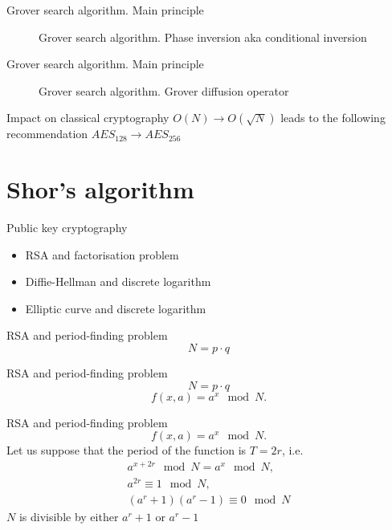 \documentclass[10pt,pdf,hyperref={unicode}]{beamer}
\begin{document}
\begin{frame}{Grover search algorithm. Main principle}
\begin{figure}
\centering

\scalebox{.9}{}

\caption{Grover search algorithm. Phase inversion aka conditional inversion}
\label{figQuantCompGroverInv}
\end{figure}
\end{frame}

\begin{frame}{Grover search algorithm. Main principle}
\begin{figure}
\centering

\scalebox{.8}{}

\caption{Grover search algorithm. Grover diffusion operator}
\label{figQuantCompGroverInvMiddle}
\end{figure}

\end{frame}


\begin{frame}{Impact on classical cryptography}
  $O(N) \rightarrow O(\sqrt{N})$
  leads to the following recommendation 
  $AES_{128} \rightarrow AES_{256}$
\end{frame}


\section{Shor's algorithm}
\begin{frame}{Public key cryptography}
\begin{itemize}
\item RSA and factorisation problem 
\item Diffie-Hellman and discrete logarithm
\item Elliptic curve and discrete logarithm
\end{itemize}
\end{frame}

\begin{frame}{RSA and period-finding problem}
\[
N = p \cdot q
\]
\end{frame}

\begin{frame}{RSA and period-finding problem}
\[
N = p \cdot q
\]
\[
f\left(x, a\right) = a^x \mod N.
\]
\end{frame}

\begin{frame}{RSA and period-finding problem}
\[
f\left(x, a\right) = a^x \mod N.
\]
Let us suppose that the period of the function is $T = 2r$, i.e.
\begin{eqnarray}
a^{x+2r} \mod N = a^x \mod N,
\nonumber \\
a^{2r} \equiv 1 \mod N,
\nonumber \\
(a^r + 1)(a^r - 1)  \equiv 0 \mod N
\nonumber
\end{eqnarray}
$N$ is divisible by either $a^r + 1$ or $a^r - 1$
\end{frame}
\end{document}
